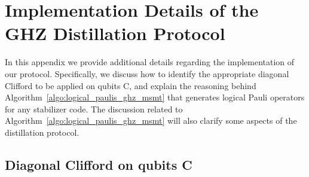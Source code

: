 \documentclass[journal,onecolumn]{IEEEtran}
\begin{document}
\section{Implementation Details of the GHZ Distillation Protocol}
\label{sec:ghz_implementation}

In this appendix we provide additional details regarding the implementation of our protocol.
Specifically, we discuss how to identify the appropriate diagonal Clifford to be applied on qubits C, and explain the reasoning behind Algorithm~\ref{algo:logical_paulis_ghz_msmt} that generates logical Pauli operators for any stabilizer code.
The discussion related to Algorithm~\ref{algo:logical_paulis_ghz_msmt} will also clarify some aspects of the distillation protocol.


\subsection{Diagonal Clifford on qubits C}
\label{sec:diagonal_clifford}
\end{document}

